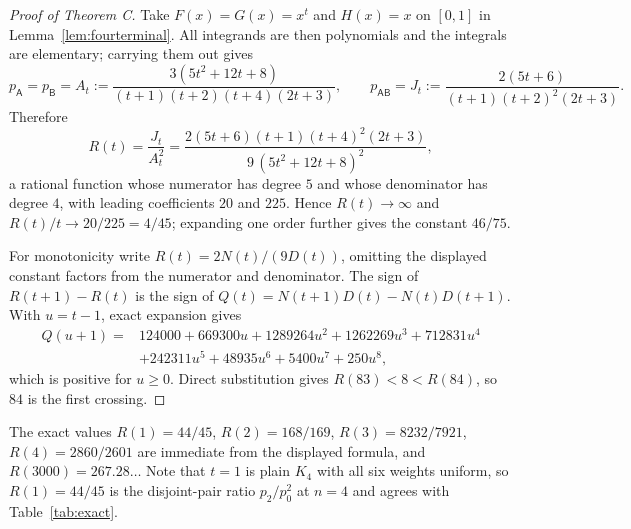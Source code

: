 \documentclass[10pt,a4paper]{amsart}
\begin{document}
\begin{proof}[Proof of Theorem C]
Take $F(x)=G(x)=x^t$ and $H(x)=x$ on $[0,1]$ in Lemma~\ref{lem:fourterminal}.
All integrands are then polynomials and the integrals are elementary; carrying
them out gives
\begin{equation}
\label{eq:AtJt}
p_{\mathsf A}=p_{\mathsf B}=A_t:=\frac{3(5t^2+12t+8)}{(t+1)(t+2)(t+4)(2t+3)},
\qquad
p_{\mathsf{AB}}=J_t:=\frac{2(5t+6)}{(t+1)(t+2)^2(2t+3)} .
\end{equation}
Therefore
\[
R(t)=\frac{J_t}{A_t^2}
=\frac{2(5t+6)(t+1)(t+4)^2(2t+3)}{9\,(5t^2+12t+8)^2},
\]
a rational function whose numerator has degree $5$ and whose denominator has
degree $4$, with leading coefficients $20$ and $225$. Hence $R(t)\to\infty$ and
$R(t)/t\to20/225=4/45$; expanding one order further gives the constant $46/75$.

For monotonicity write $R(t)=2N(t)/(9D(t))$, omitting the displayed constant
factors from the numerator and denominator. The sign of $R(t+1)-R(t)$ is the
sign of $Q(t)=N(t+1)D(t)-N(t)D(t+1)$. With $u=t-1$, exact expansion gives
\begin{align*}
Q(u+1)={}&124000+669300u+1289264u^2+1262269u^3+712831u^4\\
&+242311u^5+48935u^6+5400u^7+250u^8,
\end{align*}
which is positive for $u\ge0$. Direct substitution gives $R(83)<8<R(84)$,
so $84$ is the first crossing.
\end{proof}

The exact values $R(1)=44/45$, $R(2)=168/169$, $R(3)=8232/7921$,
$R(4)=2860/2601$ are immediate from the displayed formula, and
$R(3000)=267.28\ldots$ Note
that $t=1$ is plain $K_4$ with all six weights uniform, so $R(1)=44/45$ is the
disjoint-pair ratio $p_2/p_0^2$ at $n=4$ and agrees with Table~\ref{tab:exact}.
\end{document}
